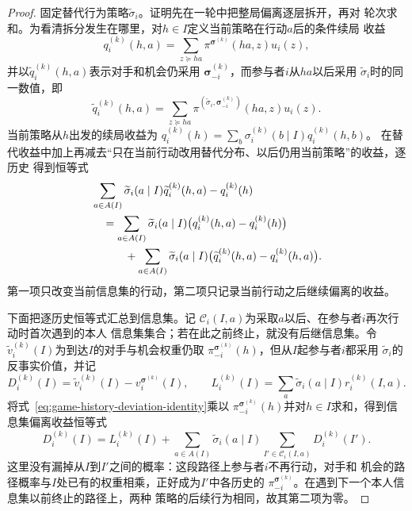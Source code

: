 \begin{proof}
固定替代行为策略\(\widetilde{\sigma}_i\)。证明先在一轮中把整局偏离逐层拆开，再对
轮次求和。为看清拆分发生在哪里，对\(h\in I\)定义当前策略在行动\(a\)后的条件续局
收益
\[
  q_i^{(k)}(h,a)
  =
  \sum_{z\succeq ha}
  \pi^{\bm{\sigma}^{(k)}}(ha,z)u_i(z),
\]
并以\(\widetilde q_i^{(k)}(h,a)\)表示对手和机会仍采用
\(\bm{\sigma}_{-i}^{(k)}\)，而参与者\(i\)从\(ha\)以后采用
\(\widetilde{\sigma}_i\)时的同一数值，即
\[
  \widetilde q_i^{(k)}(h,a)
  =
  \sum_{z\succeq ha}
  \pi^{(\widetilde{\sigma}_i,\bm{\sigma}_{-i}^{(k)})}(ha,z)
  u_i(z).
\]
当前策略从\(h\)出发的续局收益为
\(q_i^{(k)}(h)=\sum_b\sigma_i^{(k)}(b\mid I)q_i^{(k)}(h,b)\)。
在替代收益中加上再减去“只在当前行动改用替代分布、以后仍用当前策略”的收益，逐历史
得到恒等式
\begin{align}
  &\sum_{a\in A(I)}
  \widetilde{\sigma}_i(a\mid I)
  \widetilde q_i^{(k)}(h,a)
  -
  q_i^{(k)}(h)
  \notag\\
  &\quad=
  \sum_{a\in A(I)}
  \widetilde{\sigma}_i(a\mid I)
  \bigl(q_i^{(k)}(h,a)-q_i^{(k)}(h)\bigr)
  \notag\\
  &\qquad\quad+
  \sum_{a\in A(I)}
  \widetilde{\sigma}_i(a\mid I)
  \bigl(
    \widetilde q_i^{(k)}(h,a)-q_i^{(k)}(h,a)
  \bigr).
  \label{eq:game-history-deviation-identity}
\end{align}
第一项只改变当前信息集的行动，第二项只记录当前行动之后继续偏离的收益。

下面把逐历史恒等式汇总到信息集。记
\(\mathcal{C}_i(I,a)\)为采取\(a\)以后、在参与者\(i\)再次行动时首次遇到的本人
信息集集合；若在此之前终止，就没有后继信息集。令
\(\widetilde v_i^{(k)}(I)\)为到达\(I\)的对手与机会权重仍取
\(\pi_{-i}^{\bm{\sigma}^{(k)}}(h)\)，但从\(I\)起参与者\(i\)都采用
\(\widetilde{\sigma}_i\)的反事实价值，并记
\[
  D_i^{(k)}(I)
  =
  \widetilde v_i^{(k)}(I)
  -
  v_i^{\bm{\sigma}^{(k)}}(I),
  \qquad
  L_i^{(k)}(I)
  =
  \sum_a
  \widetilde{\sigma}_i(a\mid I)r_i^{(k)}(I,a).
\]
将式~\eqref{eq:game-history-deviation-identity}乘以
\(\pi_{-i}^{\bm{\sigma}^{(k)}}(h)\)并对\(h\in I\)求和，得到信息集偏离收益恒等式
\begin{equation}
  D_i^{(k)}(I)
  =
  L_i^{(k)}(I)
  +
  \sum_{a\in A(I)}
  \widetilde{\sigma}_i(a\mid I)
  \sum_{I'\in\mathcal{C}_i(I,a)}
  D_i^{(k)}(I').
  \label{eq:game-information-set-deviation-identity}
\end{equation}
这里没有漏掉从\(I\)到\(I'\)之间的概率：这段路径上参与者\(i\)不再行动，对手和
机会的路径概率与\(I\)处已有的权重相乘，正好成为\(I'\)中各历史的
\(\pi_{-i}^{\bm{\sigma}^{(k)}}\)。在遇到下一个本人信息集以前终止的路径上，两种
策略的后续行为相同，故其第二项为零。


\end{proof}
